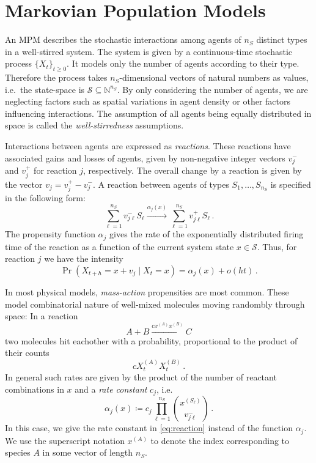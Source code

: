 
\section{Markovian Population Models}
An \acf{MPM}
describes the stochastic interactions
among agents of $n_S$ distinct types in a well-stirred system.
The system is given by a continuous-time stochastic process $\{X_t\}_{t\geq 0}$.
It models only the number of agents according to their type.
Therefore the process takes $n_S$-dimensional vectors of natural numbers as values, i.e.\ the
state-space is $\mathcal{S}\subseteq\mathbb{N}^{n_S}$.
By only considering the number of agents, we are neglecting factors such as spatial variations
in agent density or other factors influencing interactions.
The assumption of all agents being equally distributed in space is called the \emph{well-stirredness}
assumptions.

Interactions between agents are expressed as \emph{reactions}.
These reactions have associated
gains and losses of agents, given by non-negative integer vectors   
${v}_j^{-}$ and ${v}_j^{+}$ for reaction $j$, respectively. The overall change by a reaction is given by the vector $v_j = v_j^+ - v_j^-$.
A reaction between agents of types $S_1,\dots, S_{n_S}$ is specified in the following form:
\begin{equation}\label{eq:reaction}
    \sum_{\ell=1}^{n_S} v_{j\ell}^{-} S_\ell
    \xrightarrow{\alpha_j( x)}
    \sum_{\ell=1}^{n_S} v_{j\ell}^{+} S_\ell\,.
\end{equation}
The propensity function $\alpha_j$ gives the rate of the exponentially distributed firing
time of the reaction as a function of the current system state $x\in \mathcal{S}$.
Thus, for reaction $j$ we have the intensity
\begin{equation}\label{eq:firing}
	\Pr\left(X_{t+h}=x+v_j\mid X_{t}=x\right)
	=
	\alpha_j(x) + o(h t)\,.
\end{equation}


In most physical models, \emph{mass-action} propensities are most common.
These model combinatorial nature of well-mixed molecules moving randombly through space:
In a reaction
$$ A + B \xrightarrow{c x^{(A)} x^{(B)}} C $$
two molecules hit eachother with a probability, proportional to the product of their counts
$$ c X^{(A)}_t X^{(B)}_t\,. $$
In general such rates are given by the product of the number
of reactant combinations in $x$ and a
\emph{rate constant} $c_j$, i.e.
\begin{equation}\label{eq:stoch_mass_action}
	\alpha_j({x})\coloneqq c_j\prod_{\ell=1}^{n_S}\binom{x^{(S_{\ell})}}{v_{j\ell}^{-}}\,.
\end{equation}
In this case, we give the rate constant in \eqref{eq:reaction} instead of the function $\alpha_j$.
We use the superscript notation $x^{(A)}$ to denote the index corresponding to species $A$ 
in some vector of length $n_S$.

